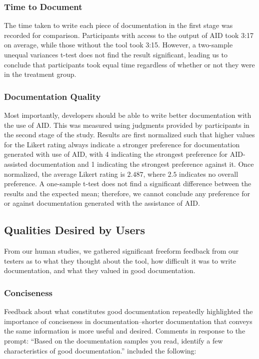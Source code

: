 \documentclass[preprint]{sigplanconf}
\begin{document}
\subsubsection{Time to Document}
The time taken to write each piece of documentation in the first stage was recorded for comparison. Participants with access to the output of AID took 3:17 on average, while those without the tool took 3:15. However, a two-sample unequal variances t-test does not find the result significant, leading us to conclude that participants took equal time regardless of whether or not they were in the treatment group.

\subsubsection{Documentation Quality}
Most importantly, developers should be able to write better documentation with the use of AID. This was measured using judgments provided by participants in the second stage of the study. Results are first normalized such that higher values for the Likert rating always indicate a stronger preference for documentation generated with use of AID, with 4 indicating the strongest preference for AID-assisted documentation and 1 indicating the strongest preference against it. Once normalized, the average Likert rating is \(2.487\), where \(2.5\) indicates no overall preference. A one-sample t-test does not find a significant difference between the results and the expected mean; therefore, we cannot conclude any preference for or against documentation generated with the assistance of AID.

\subsection{Qualities Desired by Users}
From our human studies, we gathered significant freeform feedback from our testers as to what they thought about the tool, how difficult it was to write documentation, and what they valued in good documentation.

\subsubsection{Conciseness}

Feedback about what constitutes good documentation repeatedly highlighted the importance of conciseness in documentation--shorter documentation that conveys the same information is more useful and desired. Comments in response to the prompt: ``Based on the documentation samples you read, identify a few characteristics of good documentation.'' included the following:
\end{document}
